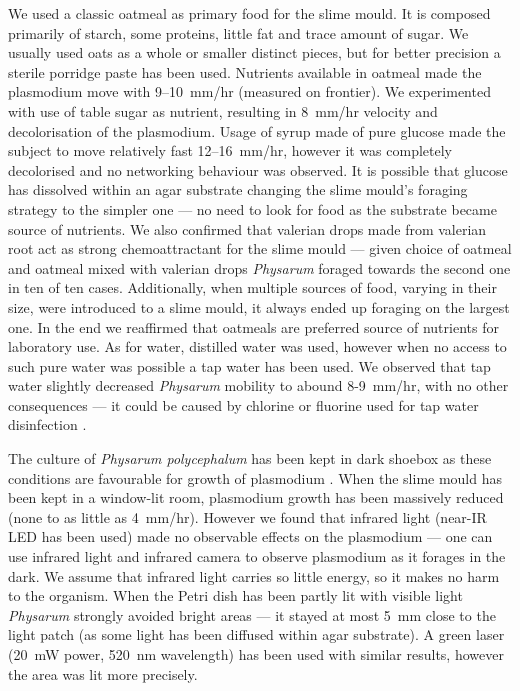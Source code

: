 \documentclass[english,a4paper,twoside]{ppfcmthesis}
\begin{document}
We used a classic oatmeal as primary food for the slime mould. It is composed primarily of starch, some proteins, little fat and trace amount of sugar. We usually used oats as a whole or smaller distinct pieces, but for better precision a sterile porridge paste has been used. Nutrients available in oatmeal made the plasmodium move with 9--10~mm/hr (measured on frontier). We experimented with use of table sugar as nutrient, resulting in 8~mm/hr velocity and decolorisation of the plasmodium. Usage of syrup made of pure glucose made the subject to move relatively fast 12--16~mm/hr, however it was completely decolorised and no networking behaviour was observed. It is possible that glucose has dissolved within an agar substrate changing the slime mould's foraging strategy to the simpler one --- no need to look for food as the substrate became source of nutrients. We also confirmed that valerian drops made from valerian root act as strong chemoattractant for the slime mould \cite{adamatzky2012physarum} --- given choice of oatmeal and oatmeal mixed with valerian drops \textit{Physarum} foraged towards the second one in ten of ten cases. Additionally, when multiple sources of food, varying in their size, were introduced to a slime mould, it always ended up foraging on the largest one. In the end we reaffirmed that oatmeals are preferred source of nutrients for laboratory use. As for water, distilled water was used, however when no access to such pure water was possible a tap water has been used. We observed that tap water slightly decreased \textit{Physarum} mobility to abound 8-9~mm/hr, with no other consequences --- it could be caused by chlorine or fluorine used for tap water disinfection \cite{uden1983chlorinated}.

The culture of \textit{Physarum polycephalum} has been kept in dark shoebox as these conditions are favourable for growth of plasmodium \cite{adamatzky2010physarum}. When the slime mould has been kept in a window-lit room, plasmodium growth has been massively reduced (none to as little as 4~mm/hr). However we found that infrared light (near-IR LED has been used) made no observable effects on the plasmodium --- one can use infrared light and infrared camera to observe plasmodium as it forages in the dark. We assume that infrared light carries so little energy, so it makes no harm to the organism. When the Petri dish has been partly lit with visible light \textit{Physarum} strongly avoided bright areas --- it stayed at most 5~mm close to the light patch (as some light has been diffused within agar substrate). A green laser (20~mW power, 520~nm wavelength) has been used with similar results, however the area was lit more precisely. 
\end{document}
